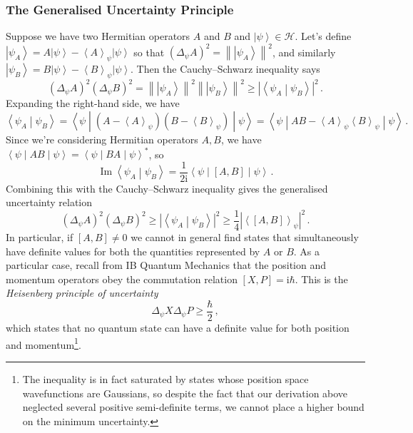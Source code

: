 \documentclass{article}
\theoremstyle{plain}\theoremheaderfont{\normalfont\itshape}\theorembodyfont{\rmfamily}\theoremseparator{.}\newtheorem*{rem}{Remark}\newtheorem*{ex}{Example}\newtheorem*{proof}{Proof}\newtheorem*{altp}{Alternative proof}
\theoremstyle{plain}\theoremheaderfont{\normalfont\bfseries}\theorembodyfont{\rmfamily}\theoremseparator{.}\newtheorem{thm}{Theorem}[section]\newtheorem{lem}[thm]{Lemma}\newtheorem{prop}[thm]{Proposition}\newtheorem*{cor}{Corollary}\newtheorem{defn}[thm]{Definition}\newtheorem{clm}[thm]{Claim}\newtheorem{clminproof}{Claim}
\theoremstyle{break}\theoremheaderfont{\normalfont\itshape}\theorembodyfont{\rmfamily}\theoremseparator{.\medskip}\newtheorem*{proofskip}{Proof}\newtheorem*{exs}{Examples}\newtheorem*{rems}{Remarks}
\theoremstyle{break}\theoremheaderfont{\normalfont\bfseries}\theorembodyfont{\rmfamily}\theoremseparator{.\medskip}\newtheorem{lemskip}[thm]{Lemma}\newtheorem{defnskip}[thm]{Definition}\newtheorem{propskip}[thm]{Proposition}\newtheorem{thmskip}[thm]{Theorem}
\numberwithin{equation}{section}
\newcommand{\ii}{\mathrm{i}}
\newcommand{\ket}[1]{\left| #1 \right\rangle}
\newcommand{\braket}[2]{\left\langle #1 \middle| #2 \right\rangle}
\newcommand{\eval}[1]{\left\langle #1 \right\rangle}
\newcommand{\expval}[2]{\left\langle #2 \middle| #1 \middle| #2 \right\rangle}
\newcommand{\abs}[1]{\left| #1 \right|}
\newcommand{\norm}[1]{\left\| #1 \right\|}
\newcommand{\hb}{\mathcal{H}}
\renewcommand{\Im}{\operatorname{Im}}
\begin{document}
    \subsubsection{The Generalised Uncertainty Principle}
    Suppose we have two Hermitian operators \(A\) and \(B\) and \(\ket{\psi}\in\hb\). Let's define \(\ket{\psi_A}=A\ket{\psi}-\eval{A}_\psi\ket{\psi}\) so that \((\Delta_\psi A)^2=\norm{\ket{\psi_A}}^2\), and similarly \(\ket{\psi_B}=B\ket{\psi}-\eval{B}_\psi\ket{\psi}\). Then the Cauchy--Schwarz inequality says
    \begin{equation}
        (\Delta_\psi A)^2(\Delta_\psi B)^2=\norm{\ket{\psi_A}}^2\norm{\ket{\psi_B}}^2\ge\abs{\braket{\psi_A}{\psi_B}}^2\,.
    \end{equation}
    Expanding the right-hand side, we have
    \begin{equation}
        \braket{\psi_A}{\psi_B}=\expval{(A-\eval{A}_\psi)(B-\eval{B}_\psi)}{\psi}=\expval{AB-\eval{A}_\psi\eval{B}_\psi}{\psi}\,.
    \end{equation}
    Since we're considering Hermitian operators \(A,B\), we have \(\expval{AB}{\psi}=\expval{BA}{\psi}^*\), so
    \begin{equation}
        \Im\braket{\psi_A}{\psi_B}=\frac{1}{2\ii}\expval{[A,B]}{\psi}\,.
    \end{equation}
    Combining this with the Cauchy--Schwarz inequality gives the generalised uncertainty relation
    \begin{equation}
        (\Delta_\psi A)^2(\Delta_\psi B)^2\ge\abs{\braket{\psi_A}{\psi_B}}^2\ge\frac{1}{4}\abs{\eval{[A,B]}_\psi}^2\,.
    \end{equation}
    In particular, if \([A,B]\ne 0\) we cannot in general find states that simultaneously have definite values for both the quantities represented by \(A\) or \(B\). As a particular case, recall from IB Quantum Mechanics that the position and momentum operators obey the commutation relation \([X,P]=\ii\hbar\). This is the \textit{Heisenberg principle of uncertainty}
    \begin{equation}
        \Delta_\psi X\Delta_\psi P\ge\frac{\hbar}{2}\,,
    \end{equation}
    which states that no quantum state can have a definite value for both position and momentum\footnote{The inequality is in fact saturated by states whose position space wavefunctions are Gaussians, so despite the fact that our derivation above neglected several positive semi-definite terms, we cannot place a higher bound on the minimum uncertainty.}.
\end{document}
